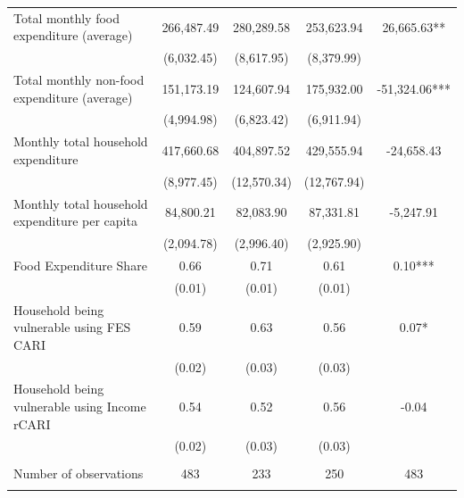 \begin{tabular}{@{\extracolsep{5pt}}lcccc}
Total monthly food expenditure (average)   & 266,487.49    & 280,289.58    & 253,623.94    & 26,665.63**   \\
 & (6,032.45)  & (8,617.95)  & (8,379.99)  &  \\ [1ex]
Total monthly non-food expenditure (average)   & 151,173.19    & 124,607.94    & 175,932.00    & -51,324.06***   \\
 & (4,994.98)  & (6,823.42)  & (6,911.94)  &  \\ [1ex]
Monthly total household expenditure   & 417,660.68    & 404,897.52    & 429,555.94    & -24,658.43   \\
 & (8,977.45)  & (12,570.34)  & (12,767.94)  &  \\ [1ex]
Monthly total household expenditure per capita   & 84,800.21    & 82,083.90    & 87,331.81    & -5,247.91   \\
 & (2,094.78)  & (2,996.40)  & (2,925.90)  &  \\ [1ex]
Food Expenditure Share   & 0.66    & 0.71    & 0.61    & 0.10***   \\
 & (0.01)  & (0.01)  & (0.01)  &  \\ [1ex]
Household being vulnerable using FES CARI   & 0.59    & 0.63    & 0.56    & 0.07*   \\
 & (0.02)  & (0.03)  & (0.03)  &  \\ [1ex]
Household being vulnerable using Income rCARI   & 0.54    & 0.52    & 0.56    & -0.04   \\
 & (0.02)  & (0.03)  & (0.03)  &  \\ [1ex]
\hline \\[-1.8ex]
Number of observations  & 483   & 233   & 250  & 483  \\
\hline \hline \\[-1.8ex]

\end{tabular}
